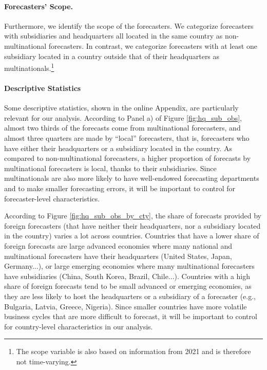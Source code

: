 \paragraph{Forecasters' Scope.} Furthermore, we identify the scope of the forecasters. We categorize forecasters with subsidiaries and headquarters all located in the same country as non-multinational forecasters. In contrast, we categorize forecasters with at least one subsidiary located in a country outside that of their headquarters as multinationals.\footnote{The scope variable is also based on information from 2021 and is therefore not time-varying.}

\paragraph{Descriptive Statistics} Some descriptive statistics, shown in the online Appendix, are particularly relevant for our analysis. According to Panel a) of Figure \ref{fig:hq_sub_obs}, almost two thirds of the forecasts come from multinational forecasters, and almost three quarters are made by ``local'' forecasters, that is, forecasters who have either their headquarters or a subsidiary located in the country. As compared to non-multinational forecasters, a higher proportion of forecasts by multinational forecasters is local, thanks to their subsidiaries. Since multinationals are also more likely to have well-endowed forecasting departments and to make smaller forecasting errors, it will be important to control for forecaster-level characteristics.

According to Figure \ref{fig:hq_sub_obs_by_cty}, the share of forecasts provided by foreign forecasters (that have neither their headquarters, nor a subsidiary located in the country) varies a lot across countries. Countries that have a lower share of foreign forecasts are large advanced economies where many national and multinational forecasters have their headquarters (United States, Japan, Germany...), or large emerging economies where many multinational forecasters have subsidiaries (China, South Korea, Brazil, Chile...). Countries with a high share of foreign forecasts tend to be small advanced or emerging economies, as they are less likely to host the headquarters or a subsidiary of a forecaster (e.g., Bulgaria, Latvia, Greece, Nigeria). Since smaller countries have more volatile business cycles that are more difficult to forecast, it will be important to control for country-level characteristics in our analysis.

